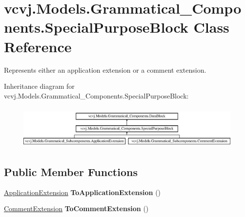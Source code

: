 \hypertarget{classvcvj_1_1_models_1_1_grammatical___components_1_1_special_purpose_block}{}\section{vcvj.\+Models.\+Grammatical\+\_\+\+Components.\+Special\+Purpose\+Block Class Reference}
\label{classvcvj_1_1_models_1_1_grammatical___components_1_1_special_purpose_block}


Represents either an application extension or a comment extension.  


Inheritance diagram for vcvj.\+Models.\+Grammatical\+\_\+\+Components.\+Special\+Purpose\+Block\+:\begin{figure}[H]
\begin{center}
\leavevmode
\includegraphics[height=2.216359cm]{classvcvj_1_1_models_1_1_grammatical___components_1_1_special_purpose_block}
\end{center}
\end{figure}
\subsection*{Public Member Functions}
\begin{DoxyCompactItemize}
\item 
\hyperlink{classvcvj_1_1_models_1_1_grammatical___subcomponents_1_1_application_extension}{Application\+Extension} {\bfseries To\+Application\+Extension} ()\hypertarget{classvcvj_1_1_models_1_1_grammatical___components_1_1_special_purpose_block_acf4bf6c98af6790d1b6362360aa4b9c0}{}\label{classvcvj_1_1_models_1_1_grammatical___components_1_1_special_purpose_block_acf4bf6c98af6790d1b6362360aa4b9c0}

\item 
\hyperlink{classvcvj_1_1_models_1_1_grammatical___subcomponents_1_1_comment_extension}{Comment\+Extension} {\bfseries To\+Comment\+Extension} ()\hypertarget{classvcvj_1_1_models_1_1_grammatical___components_1_1_special_purpose_block_a6a6edb15fa32b803f7b36eeceb06b648}{}\label{classvcvj_1_1_models_1_1_grammatical___components_1_1_special_purpose_block_a6a6edb15fa32b803f7b36eeceb06b648}

\end{DoxyCompactItemize}
